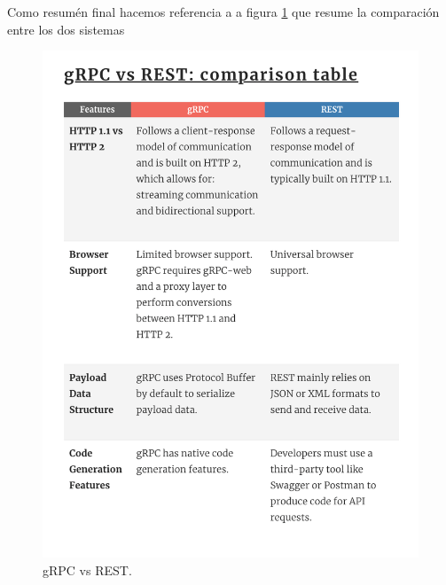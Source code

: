 Como resumén final hacemos referencia a a figura \ref{fig:gRPC vs REST} que resume la comparación entre los dos sistemas

\begin{figure}[H]
    \centering
    \includegraphics[height=0.3\textheight]{./part/Proyecto_ejecutivo/memoria_constructiva/rpc/img/rpcComparison}
    \caption{gRPC vs REST.\cite{berga_santos_2023}}\label{fig:gRPC vs REST}
\end{figure}